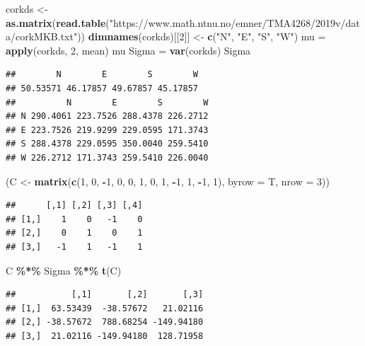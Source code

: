 \documentclass[
  ignorenonframetext,
]{beamer}
\newenvironment{Shaded}{\begin{snugshade}}{\end{snugshade}}
\newcommand{\AttributeTok}[1]{\textcolor[rgb]{0.13,0.29,0.53}{#1}}
\newcommand{\DecValTok}[1]{\textcolor[rgb]{0.00,0.00,0.81}{#1}}
\newcommand{\FunctionTok}[1]{\textcolor[rgb]{0.13,0.29,0.53}{\textbf{#1}}}
\newcommand{\NormalTok}[1]{#1}
\newcommand{\OtherTok}[1]{\textcolor[rgb]{0.56,0.35,0.01}{#1}}
\newcommand{\SpecialCharTok}[1]{\textcolor[rgb]{0.81,0.36,0.00}{\textbf{#1}}}
\newcommand{\StringTok}[1]{\textcolor[rgb]{0.31,0.60,0.02}{#1}}
\begin{document}
\begin{frame}[fragile]
\tiny

\begin{Shaded}
\begin{Highlighting}[]
\NormalTok{corkds }\OtherTok{\textless{}{-}} \FunctionTok{as.matrix}\NormalTok{(}\FunctionTok{read.table}\NormalTok{(}\StringTok{"https://www.math.ntnu.no/emner/TMA4268/2019v/data/corkMKB.txt"}\NormalTok{))}
\FunctionTok{dimnames}\NormalTok{(corkds)[[}\DecValTok{2}\NormalTok{]] }\OtherTok{\textless{}{-}} \FunctionTok{c}\NormalTok{(}\StringTok{"N"}\NormalTok{, }\StringTok{"E"}\NormalTok{, }\StringTok{"S"}\NormalTok{, }\StringTok{"W"}\NormalTok{)}
\NormalTok{mu }\OtherTok{=} \FunctionTok{apply}\NormalTok{(corkds, }\DecValTok{2}\NormalTok{, mean)}
\NormalTok{mu}
\NormalTok{Sigma }\OtherTok{=} \FunctionTok{var}\NormalTok{(corkds)}
\NormalTok{Sigma}
\end{Highlighting}
\end{Shaded}

\begin{verbatim}
##        N        E        S        W 
## 50.53571 46.17857 49.67857 45.17857 
##          N        E        S        W
## N 290.4061 223.7526 288.4378 226.2712
## E 223.7526 219.9299 229.0595 171.3743
## S 288.4378 229.0595 350.0040 259.5410
## W 226.2712 171.3743 259.5410 226.0040
\end{verbatim}

\begin{Shaded}
\begin{Highlighting}[]
\NormalTok{(C }\OtherTok{\textless{}{-}} \FunctionTok{matrix}\NormalTok{(}\FunctionTok{c}\NormalTok{(}\DecValTok{1}\NormalTok{, }\DecValTok{0}\NormalTok{, }\SpecialCharTok{{-}}\DecValTok{1}\NormalTok{, }\DecValTok{0}\NormalTok{, }\DecValTok{0}\NormalTok{, }\DecValTok{1}\NormalTok{, }\DecValTok{0}\NormalTok{, }\DecValTok{1}\NormalTok{, }\SpecialCharTok{{-}}\DecValTok{1}\NormalTok{, }\DecValTok{1}\NormalTok{, }\SpecialCharTok{{-}}\DecValTok{1}\NormalTok{, }\DecValTok{1}\NormalTok{), }\AttributeTok{byrow =}\NormalTok{ T, }\AttributeTok{nrow =} \DecValTok{3}\NormalTok{))}
\end{Highlighting}
\end{Shaded}

\begin{verbatim}
##      [,1] [,2] [,3] [,4]
## [1,]    1    0   -1    0
## [2,]    0    1    0    1
## [3,]   -1    1   -1    1
\end{verbatim}

\begin{Shaded}
\begin{Highlighting}[]
\NormalTok{C }\SpecialCharTok{\%*\%}\NormalTok{ Sigma }\SpecialCharTok{\%*\%} \FunctionTok{t}\NormalTok{(C)}
\end{Highlighting}
\end{Shaded}

\begin{verbatim}
##           [,1]       [,2]       [,3]
## [1,]  63.53439  -38.57672   21.02116
## [2,] -38.57672  788.68254 -149.94180
## [3,]  21.02116 -149.94180  128.71958
\end{verbatim}
\end{frame}
\end{document}
